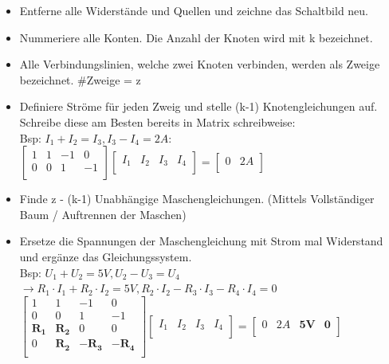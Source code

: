 					            \begin{center}
					              \begin{itemize}
					                \item Entferne alle Widerstände und Quellen und zeichne das Schaltbild neu.
					                \item Nummeriere alle Konten. Die Anzahl der Knoten wird mit k bezeichnet.
					                \item Alle Verbindungslinien, welche zwei Knoten verbinden, werden als Zweige bezeichnet. \#Zweige = z
					                \item Definiere Ströme für jeden Zweig und stelle (k-1) Knotengleichungen auf. Schreibe diese am Besten bereits in Matrix schreibweise: \\
					                Bsp: $I_1 + I_2 = I_3, I_3 - I_4 = 2A $: \\
					                $
					 \left[ {\begin{array}{cccc}
					    1 & 1 & -1 & 0 \\
					    0 & 0 & 1 & -1 \\					\end{array} } \right] \left[ {\begin{array}{c} I_1 & I_2 & I_3 & I_4 \\ \end{array} } \right] =   \left[ {\begin{array}{c}  0 & 2A\\ \end{array} } \right] $ \\

					                \item Finde z - (k-1) Unabhängige Maschengleichungen. (Mittels Vollständiger Baum / Auftrennen der Maschen)
					                \item Ersetze die Spannungen der Maschengleichung mit Strom mal Widerstand und ergänze das Gleichungssystem.
					                \\ Bsp:
					                $U_1 + U_2 = 5V, U_2 - U_3 = U_4$ \\ $ \rightarrow R_1 \cdot I_1 + R_2 \cdot I_2 = 5V, R_2 \cdot I_2 - R_3 \cdot I_3 - R_4 \cdot I_4 = 0$ \\
					                $
					 \left[ {\begin{array}{cccc}
					    1 & 1 & -1 & 0 \\
					    0 & 0 & 1 & -1 \\
					    \mathbf{R_1} & \mathbf{R_2} & 0 & 0 \\
					    0 & \mathbf{R_2} & \mathbf{-R_3} & \mathbf{-R_4} \\
					\end{array} } \right] \left[ {\begin{array}{c} I_1 & I_2 & I_3 & I_4 \\ \end{array} } \right] =   \left[ {\begin{array}{c}  0 & 2A & \mathbf{5V} & \mathbf{0} \\ \end{array} } \right] $ \\

					              \end{itemize}
					            \end{center}
					            \iend
